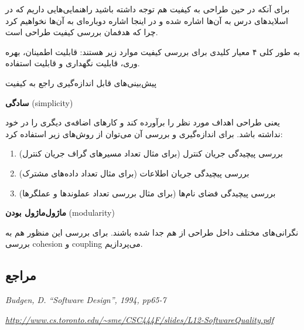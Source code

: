 {برای آنکه در حین طراحی به کیفیت هم توجه داشته باشید راهنمایی‌هایی داریم که در اسلاید‌های درس به آن‌ها اشاره شده و در اینجا اشاره‌ دوباره‌ای به آن‌ها نخواهیم کرد چرا که هدفمان بررسی کیفیت طراحی است.

به طور کلی ۴ معیار کلیدی برای بررسی کیفیت موارد زیر هستند:
قابلیت اطمینان، بهره وری، قابلیت نگهداری و قابلیت استفاده.

{\Large پیش‌بینی‌های قابل اندازه‌گیری راجع به کیفیت}

{\large \textbf{سادگی} (simplicity)}

یعنی طراحی اهداف مورد نظر را برآورده کند و کارهای اضافه‌ی دیگری را در خود نداشته باشد. برای اندازه‌گیری و بررسی آن می‌توان از روش‌های زیر استفاده کرد:
\begin{enumerate}
	\item بررسی پیچیدگی جریان کنترل (برای مثال تعداد مسیرهای گراف جریان کنترل)
	\item بررسی پیچیدگی جریان اطلاعات (برای مثال تعداد داده‌های مشترک)
	\item بررسی پیچیدگی فضای نام‌ها (برای مثال بررسی تعداد عملوند‌ها و عملگرها)
\end{enumerate}


{\large \textbf{ماژول‌ماژول بودن} (modularity)}

نگرانی‌های مختلف داخل طراحی از هم جدا شده باشند. برای بررسی این منظور هم  به بررسی cohesion و coupling می‌پردازیم.


\subsection*{مراجع}

\begin{latin}
	\begingroup
	\renewcommand{\section}[2]{}%
	
\begin{thebibliography}{9}
	\textit{Budgen, D. “Software Design”, 1994, pp65-7}
	
	\textit{\url{http://www.cs.toronto.edu/~sme/CSC444F/slides/L12-SoftwareQuality.pdf}}

\end{thebibliography}
\endgroup
\end{latin}

}
